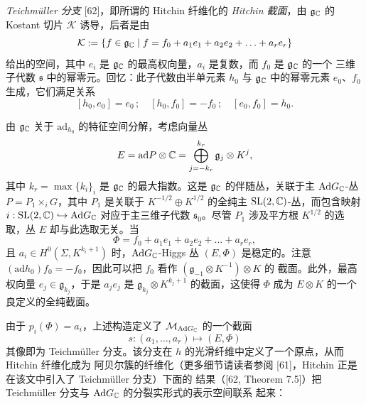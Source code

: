 
\emph{Teichmüller 分支} [62]，即所谓的 Hitchin 纤维化的 \emph{Hitchin 截面}，由 $\mathfrak{g}_{\mathbb{C}}$ 的
Kostant 切片 $\mathcal{K}$ 诱导，后者是由
\[
\mathcal{K}:=\{f\in\mathfrak{g}_{\mathbb{C}}\mid f=f_0+a_1e_1+a_2e_2+\ldots+a_re_r\}
\]
给出的空间，其中 $e_i$ 是 $\mathfrak{g}_{\mathbb{C}}$ 的最高权向量，$a_i$ 是复数，而 $f_0$ 是 $\mathfrak{g}_{\mathbb{C}}$ 的一个
三维子代数 $\mathfrak{s}$ 中的幂零元。回忆：此子代数由半单元素 $h_0$ 与 $\mathfrak{g}_{\mathbb{C}}$ 中的幂零元素
$e_0$、$f_0$ 生成，它们满足关系
\[
[h_0,e_0]=e_0\,;\quad [h_0,f_0]=-f_0\,;\quad [e_0,f_0]=h_0.
\]

由 $\mathfrak{g}_{\mathbb{C}}$ 关于 $\mathrm{ad}_{h_0}$ 的特征空间分解，考虑向量丛
\[
E=\mathrm{ad}P\otimes\mathbb{C}=\bigoplus_{j=-k_r}^{k_r}\mathfrak{g}_j\otimes K^j,
\]
其中 $k_r=\max\{k_i\}_i$ 是 $\mathfrak{g}_{\mathbb{C}}$ 的最大指数。这是 $\mathfrak{g}_{\mathbb{C}}$ 的伴随丛，关联于主
$\mathrm{Ad}G_{\mathbb{C}}$-丛 $P=P_1\times_i G$，其中 $P_1$ 是关联于 $K^{-1/2}\oplus K^{1/2}$ 的全纯主
$\mathrm{SL}(2,\mathbb{C})$-丛，而包含映射 $i:\mathrm{SL}(2,\mathbb{C})\hookrightarrow\mathrm{Ad}G_{\mathbb{C}}$ 对应于主三维子代数
$\mathfrak{s}_0$。尽管 $P_1$ 涉及平方根 $K^{1/2}$ 的选取，丛 $E$ 却与此选取无关。当
\[
\Phi=f_0+a_1e_1+a_2e_2+\ldots+a_re_r,
\]
且 $a_i\in H^0(\Sigma,K^{k_i+1})$ 时，$\mathrm{Ad}G_{\mathbb{C}}$-Higgs 丛 $(E,\Phi)$ 是稳定的。注意
$(\mathrm{ad}h_0)f_0=-f_0$，因此可以把 $f_0$ 看作 $(\mathfrak{g}_{-1}\otimes K^{-1})\otimes K$ 的
截面。此外，最高权向量 $e_j\in\mathfrak{g}_{k_j}$，于是 $a_je_j$ 是 $\mathfrak{g}_{k_j}\otimes
K^{k_j+1}$ 的截面，这使得 $\Phi$ 成为 $E\otimes K$ 的一个良定义的全纯截面。

由于 $p_i(\Phi)=a_i$，上述构造定义了 $\mathcal{M}_{\mathrm{Ad}G_{\mathbb{C}}}$ 的一个截面
\begin{equation}
s:(a_1,\ldots,a_r)\mapsto(E,\Phi) \tag{3.3}
\end{equation}
其像即为 Teichmüller 分支。该分支在 $h$ 的光滑纤维中定义了一个原点，从而 Hitchin 纤维化成为
阿贝尔簇的纤维化（更多细节请读者参阅 [61]，Hitchin 正是在该文中引入了 Teichmüller 分支）下面的
结果（[62, Theorem 7.5]）把 Teichmüller 分支与 $\mathrm{Ad}G_{\mathbb{C}}$ 的分裂实形式的表示空间联系
起来：

